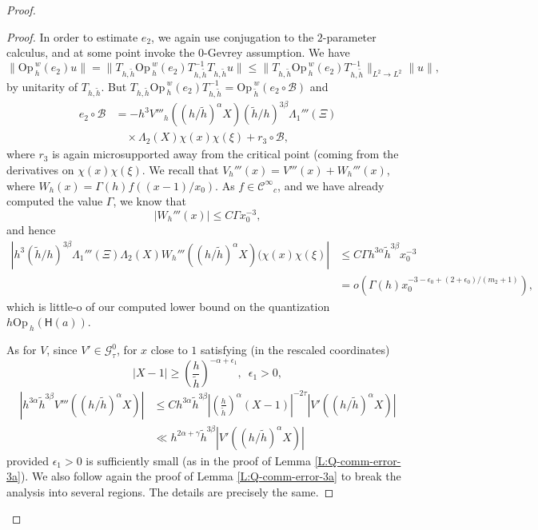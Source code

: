 \documentclass[twoside, final]{amsart}
\theoremstyle{definition}
\numberwithin{equation}{section}
\begin{document}
\begin{proof}
\begin{proof}
In order to estimate $e_2$, we again use conjugation to
the $2$-parameter calculus, and at some point invoke the 0-Gevrey assumption.  We have
\[
\| {\mathrm{Op}\,}_h^w(e_2) u \| = \| T_{h, {\tilde{h}}} {\mathrm{Op}\,}_h^w(e_2) T_{h, {\tilde{h}}}^{-1}
T_{h, {\tilde{h}}} u \| {\leqslant} \| T_{h, {\tilde{h}}} {\mathrm{Op}\,}_h^w(e_2) T_{h, {\tilde{h}}}^{-1}
\|_{L^2 \to L^2} \| u \|,
\]
by unitarity of $T_{h, {\tilde{h}}}$.  But $T_{h, {\tilde{h}}} {\mathrm{Op}\,}_h^w(e_2) T_{h,
  {\tilde{h}}}^{-1} = {\mathrm{Op}\,}_{\tilde{h}}^w(e_2 \circ {\mathcal{B}} )$ and
\begin{align*}
e_2 \circ {\mathcal{B}} & =  -h^3 V'''_h((h/{\tilde{h}})^{\alpha}X) ({\tilde{h}}/h)^{3\beta } \Lambda_1'''
(\Xi) \\
& \quad \times \Lambda_2(X) \chi(x)
\chi(\xi) + r_3 \circ {\mathcal{B}}  ,
\end{align*}
where $r_3$ is again microsupported away from the critical point
(coming from the derivatives on $\chi(x) \chi(\xi)$.  
We recall that $V_h'''(x) = V'''(x) + W_h'''(x)$, where $W_h(x) =
\Gamma(h) f((x-1)/x_0)$.  As $f \in {{\mathcal C}^\infty}_c$, and we have already
computed the value $\Gamma$, we know that 
\[
|W_h'''(x)| {\leqslant} C \Gamma x_0^{-3},
\]
and hence
\begin{align*}
| h^3 ({\tilde{h}}/h)^{3\beta} \Lambda_1'''
(\Xi) \Lambda_2(X) W_h''' ((h/{\tilde{h}})^{\alpha}X)  (\chi(x)
\chi(\xi) | & {\leqslant} C\Gamma h^{ 3 \alpha }{\tilde{h}}^{3\beta} x_0^{-3} \\
& = o(\Gamma(h) x_0^{  -3  - \epsilon_0+ (2 + \epsilon_0)/(m_2 +1)  }),
\end{align*}
which is little-o of our computed lower bound on the quantization  $h {\mathrm{Op}\,}_h
({{\textsf{H}}} (a))$.  

As for $V$, since $V' \in {\mathcal{G}}^0_\tau$, for $x$ close to $1$
satisfying (in the rescaled coordinates)
\[
| X-1 | {\geqslant} \left( \frac{h}{\tilde{h}} \right)^{-\alpha + \epsilon_1}, \,\,\,
\epsilon_1 >0, 
\]
\begin{align*}
| h^{3\alpha} {\tilde{h}}^{3\beta} V'''((h/{\tilde{h}})^{\alpha} X ) | & {\leqslant} Ch^{3\alpha} {\tilde{h}}^{3\beta} 
\left| \left( \frac{h}{\tilde{h}} \right)^{\alpha} (X-1) \right|^{-2 \tau} | V'
((h/{\tilde{h}})^{\alpha} X ) | \\
& \ll h^{2\alpha + \gamma} {\tilde{h}}^{3\beta} |  V'
((h/{\tilde{h}})^{\alpha} X ) | 
\end{align*}
provided $\epsilon_1>0$ is sufficiently small (as in the proof of
Lemma \ref{L:Q-comm-error-3a}).  We also follow again the proof of Lemma
\ref{L:Q-comm-error-3a} to break the analysis into several regions.
The details are precisely the same.


\end{proof}
\end{proof}
\end{document}
